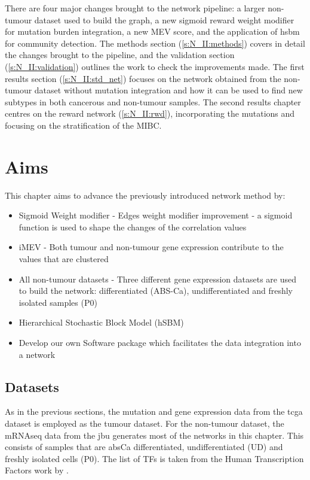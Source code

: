 There are four major changes brought to the network pipeline: a larger non-tumour dataset used to build the graph, a new sigmoid reward weight modifier for mutation burden integration, a new MEV score, and the application of \acrfull{hsbm} for community detection. The methods section (\ref{s:N_II:methods}) covers in detail the changes brought to the pipeline, and the validation section (\ref{s:N_II:validation}) outlines the work to check the improvements made. The first results section (\cref{s:N_II:std_net}) focuses on the network obtained from the non-tumour dataset without mutation integration and how it can be used to find new subtypes in both cancerous and non-tumour samples. The second results chapter centres on the reward network (\cref{s:N_II:rwd}), incorporating the mutations and focusing on the stratification of the MIBC.


\section{Aims}

This chapter aims to advance the previously introduced network method by:
\begin{itemize}
    \item Sigmoid Weight modifier - Edges weight modifier improvement - a sigmoid function is used to shape the changes of the correlation values
    \item iMEV - Both tumour and non-tumour gene expression contribute to the values that are clustered 
    \item All non-tumour datasets - Three different gene expression datasets are used to build the network: differentiated (ABS-Ca), undifferentiated and freshly isolated samples (P0)
    \item Hierarchical Stochastic Block Model (hSBM)
    \item Develop our own Software package which facilitates the data integration into a network
\end{itemize}

\subsection*{Datasets}

As in the previous sections, the mutation and gene expression data from the \acrshort{tcga} dataset is employed as the tumour dataset. For the non-tumour dataset, the mRNAseq data from the \acrfull{jbu} generates most of the networks in this chapter. This consists of samples that are \acrlong{absCa} differentiated, undifferentiated (UD) and freshly isolated cells (P0). The list of TFs is taken from the Human Transcription Factors work by \citet{Lambert2018-el}.

